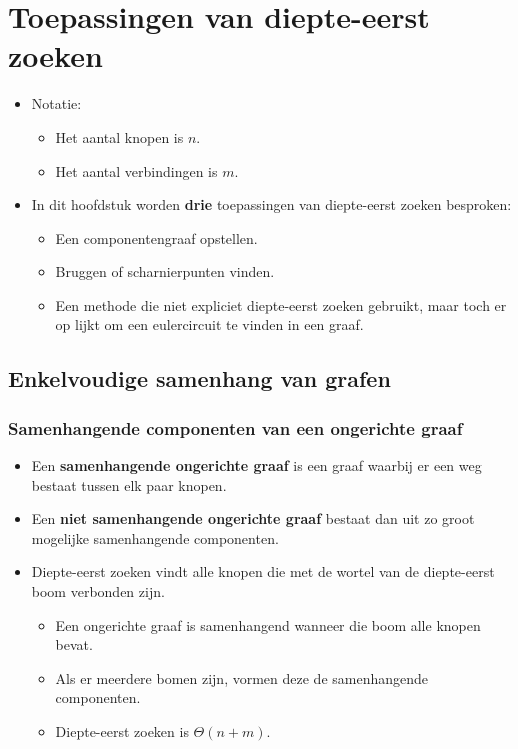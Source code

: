 \chapter{Toepassingen van diepte-eerst zoeken}
\begin{itemize}
	\item Notatie:
	\begin{itemize}
		\item Het aantal knopen is $n$.
		\item Het aantal verbindingen is $m$.
	\end{itemize}
	\item In dit hoofdstuk worden \textbf{drie} toepassingen van diepte-eerst zoeken besproken:
	\begin{itemize}
		\item Een componentengraaf opstellen.
		\item Bruggen of scharnierpunten vinden.
		\item Een methode die niet expliciet diepte-eerst zoeken gebruikt, maar toch er op lijkt om een eulercircuit te vinden in een graaf.
	\end{itemize}
\end{itemize}
\section{Enkelvoudige samenhang van grafen}
\subsection{Samenhangende componenten van een ongerichte graaf}
\begin{itemize}
	\item Een \textbf{samenhangende ongerichte graaf} is een graaf waarbij er een weg bestaat tussen elk paar knopen.
	\item Een \textbf{niet samenhangende ongerichte graaf} bestaat dan uit zo groot mogelijke samenhangende componenten.
	\item Diepte-eerst zoeken vindt alle knopen die met de wortel van de diepte-eerst boom verbonden zijn.
	\begin{itemize}
		\item Een ongerichte graaf is samenhangend wanneer die boom alle knopen bevat.
		\item Als er meerdere bomen zijn, vormen deze de samenhangende componenten.
		\item Diepte-eerst zoeken is $\Theta(n + m)$.
	\end{itemize}
\end{itemize}

